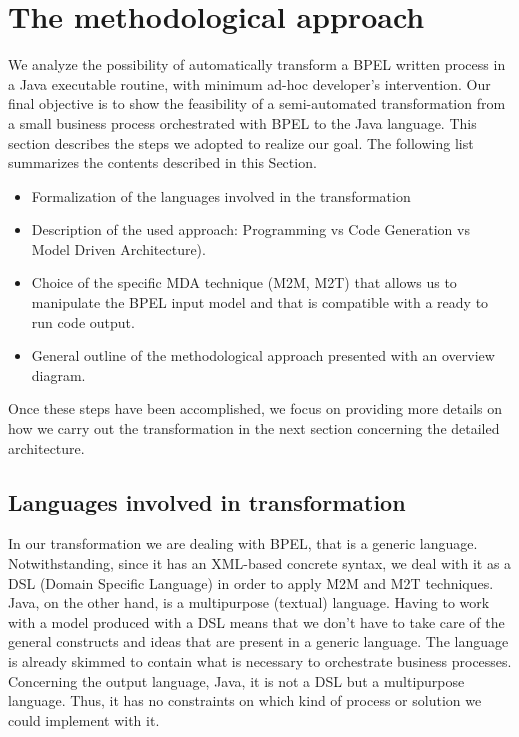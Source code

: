 \section{The methodological approach}
\label{MethodApproach}

We analyze the possibility of automatically transform a BPEL written process in a Java executable routine, with minimum ad-hoc developer’s intervention. Our final objective is to show the feasibility of a semi-automated transformation from a small business process orchestrated with BPEL to the Java language.
This section describes the steps we adopted to realize our goal. The following list summarizes the contents described in this Section.

\begin{itemize}
 \item Formalization of the languages involved in the transformation
 \item Description of the used approach: Programming vs Code Generation vs Model Driven Architecture).
 \item Choice of the specific MDA technique (M2M, M2T) that allows us to manipulate the BPEL input model and that is compatible with a ready to run code output.
 \item General outline of the methodological approach presented with an overview diagram.
\end{itemize}  

Once these steps have been accomplished, we focus on providing more details on how we carry out the transformation in the next section concerning the detailed architecture.


\subsection{Languages involved in transformation} 
\label{sec:TransfDomain}
In our transformation we are dealing with BPEL, that is a generic language. Notwithstanding, since it has an XML-based concrete syntax, we deal with it as a DSL (Domain Specific Language) in order to apply M2M and M2T techniques. Java, on the other hand, is a multipurpose (textual) language.
Having to work with a model produced with a DSL means that we don't have to take care of the general constructs and ideas that are present in a generic language. The language is already skimmed to contain what is necessary to orchestrate business processes.
Concerning the output language, Java, it is not a DSL but a multipurpose language. Thus, it has no constraints on which kind of process or solution we could implement with it. %


